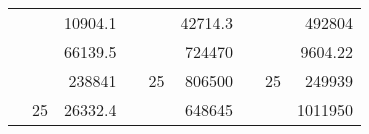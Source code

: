 \begin{table}[H]
\begin{tabular}{|ccrccrccc}
\rowcolor[HTML]{DAE8FC} 
\multicolumn{1}{|c|}{\cellcolor[HTML]{FFFFC7}}                                & \multicolumn{1}{c|}{\cellcolor[HTML]{DAE8FC}}                      & \multicolumn{1}{r|}{\cellcolor[HTML]{DAE8FC}10904.1}   & \multicolumn{1}{c|}{\cellcolor[HTML]{FFFFC7}}                                & \multicolumn{1}{c|}{\cellcolor[HTML]{DAE8FC}}                       & \multicolumn{1}{r|}{\cellcolor[HTML]{DAE8FC}42714.3}   & \multicolumn{1}{c|}{\cellcolor[HTML]{FFFFC7}}                                & \multicolumn{1}{c|}{\cellcolor[HTML]{DAE8FC}}                      & \multicolumn{1}{r|}{\cellcolor[HTML]{DAE8FC}492804}    \\ \cline{3-3} \cline{6-6} \cline{9-9} 
\multicolumn{1}{|c|}{\cellcolor[HTML]{FFFFC7}}                                & \multicolumn{1}{c|}{\cellcolor[HTML]{DAE8FC}}                      & \multicolumn{1}{r|}{\cellcolor[HTML]{DDFDFF}66139.5}   & \multicolumn{1}{c|}{\cellcolor[HTML]{FFFFC7}}                                & \multicolumn{1}{c|}{\cellcolor[HTML]{DAE8FC}}                       & \multicolumn{1}{r|}{\cellcolor[HTML]{DDFDFF}724470}    & \multicolumn{1}{c|}{\cellcolor[HTML]{FFFFC7}}                                & \multicolumn{1}{c|}{\cellcolor[HTML]{DAE8FC}}                      & \multicolumn{1}{r|}{\cellcolor[HTML]{DDFDFF}9604.22}   \\ \cline{3-3} \cline{6-6} \cline{9-9} 
\rowcolor[HTML]{DAE8FC} 
\multicolumn{1}{|c|}{\cellcolor[HTML]{FFFFC7}}                                & \multicolumn{1}{c|}{\cellcolor[HTML]{DAE8FC}}                      & \multicolumn{1}{r|}{\cellcolor[HTML]{DAE8FC}238841}    & \multicolumn{1}{c|}{\cellcolor[HTML]{FFFFC7}}                                & \multicolumn{1}{c|}{\multirow{-9}{*}{\cellcolor[HTML]{DAE8FC}25}}   & \multicolumn{1}{r|}{\cellcolor[HTML]{DAE8FC}806500}    & \multicolumn{1}{c|}{\cellcolor[HTML]{FFFFC7}}                                & \multicolumn{1}{c|}{\multirow{-9}{*}{\cellcolor[HTML]{DAE8FC}25}}  & \multicolumn{1}{r|}{\cellcolor[HTML]{DAE8FC}249939}    \\ \cline{3-3} \cline{5-6} \cline{8-9} 
\multicolumn{1}{|c|}{\cellcolor[HTML]{FFFFC7}}                                & \multicolumn{1}{c|}{\multirow{-10}{*}{\cellcolor[HTML]{DAE8FC}25}} & \multicolumn{1}{r|}{\cellcolor[HTML]{DDFDFF}26332.4}   & \multicolumn{1}{c|}{\cellcolor[HTML]{FFFFC7}}                                & \multicolumn{1}{c|}{\cellcolor[HTML]{DDFDFF}}                       & \multicolumn{1}{r|}{\cellcolor[HTML]{DAE8FC}648645}    & \multicolumn{1}{c|}{\cellcolor[HTML]{FFFFC7}}                                & \multicolumn{1}{c|}{\cellcolor[HTML]{DDFDFF}}                      & \multicolumn{1}{r|}{\cellcolor[HTML]{DAE8FC}1011950}   \\ \cline{2-3} \cline{6-6} \cline{9-9} 

\end{tabular}
\end{table}
